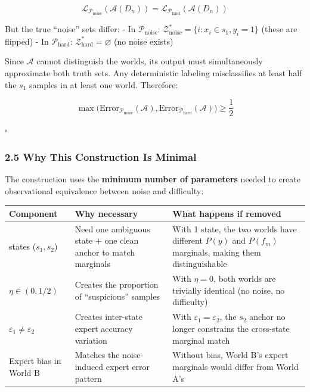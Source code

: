 \documentclass[
  12pt,
]{ctexart}
\begin{document}
\[\mathcal{L}_{\mathcal{P}_{\text{noise}}}(\mathcal{A}(D_n)) = \mathcal{L}_{\mathcal{P}_{\text{hard}}}(\mathcal{A}(D_n))\]

But the true ``noise'' sets differ: - In \(\mathcal{P}_{\text{noise}}\):
\(\mathcal{Z}^*_{\text{noise}} = \{i: x_i \in s_1, y_i = 1\}\) (these
are flipped) - In \(\mathcal{P}_{\text{hard}}\):
\(\mathcal{Z}^*_{\text{hard}} = \varnothing\) (no noise exists)

Since \(\mathcal{A}\) cannot distinguish the worlds, its output must
simultaneously approximate both truth sets. Any deterministic labeling
misclassifies at least half the \(s_1\) samples in at least one world.
Therefore:

\[\max\bigl(\text{Error}_{\mathcal{P}_{\text{noise}}}(\mathcal{A}), \text{Error}_{\mathcal{P}_{\text{hard}}}(\mathcal{A})\bigr) \geq \frac{1}{2}\]

\(\square\)

\subsubsection{2.5 Why This Construction Is
Minimal}\label{why-this-construction-is-minimal}

The construction uses the \textbf{minimum number of parameters} needed
to create observational equivalence between noise and difficulty:

\begin{longtable}[]{@{}
  >{\raggedright\arraybackslash}p{}
  >{\raggedright\arraybackslash}p{}
  >{\raggedright\arraybackslash}p{}@{}}
\toprule\noalign{}
\begin{minipage}[b]{\linewidth}\raggedright
Component
\end{minipage} & \begin{minipage}[b]{\linewidth}\raggedright
Why necessary
\end{minipage} & \begin{minipage}[b]{\linewidth}\raggedright
What happens if removed
\end{minipage} \\
\midrule\noalign{}
\endhead
\bottomrule\noalign{}
\endlastfoot
2 states (\(s_1, s_2\)) & Need one ambiguous state + one clean anchor to
match marginals & With 1 state, the two worlds have different \(P(y)\)
and \(P(f_m)\) marginals, making them distinguishable \\
\(\eta \in (0, 1/2)\) & Creates the proportion of ``suspicious'' samples
& With \(\eta = 0\), both worlds are trivially identical (no noise, no
difficulty) \\
\(\varepsilon_1 \neq \varepsilon_2\) & Creates inter-state expert
accuracy variation & With \(\varepsilon_1 = \varepsilon_2\), the \(s_2\)
anchor no longer constrains the cross-state marginal match \\
Expert bias in World B & Matches the noise-induced expert error pattern
& Without bias, World B's expert marginals would differ from World
A's \\
\end{longtable}
\end{document}
